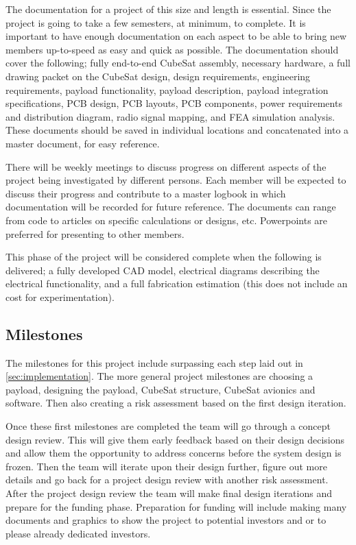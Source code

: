 \documentclass[conference]{IEEEtran} %
\begin{document}
The documentation for a project of this size and length is essential. Since the project is going to take a few semesters, at minimum, to complete. It is important
to have enough documentation on each aspect to be able to bring new members up-to-speed as easy and quick as possible. The documentation should cover the following; fully end-to-end CubeSat assembly,
necessary hardware, a full drawing packet on the CubeSat design, design requirements, engineering requirements, payload functionality, payload description, payload integration specifications, PCB design,
PCB layouts, PCB components, power requirements and distribution diagram, radio signal mapping, and FEA simulation analysis. These documents should be saved in individual locations
and concatenated into a master document, for easy reference.

There will be weekly meetings to discuss progress on different aspects of the project being investigated by different persons. Each member will be expected to discuss
their progress and contribute to a master logbook in which documentation will be recorded for future reference. The documents can range from code to articles on specific calculations
or designs, etc. Powerpoints are preferred for presenting to other members.

This phase of the project will be considered complete when the following is delivered; a fully developed CAD model, electrical diagrams describing the electrical functionality,
and a full fabrication estimation (this does not include an cost for experimentation).

\subsection{Milestones}
\label{subsec:milestones}
The milestones for this project include surpassing each step laid out in \autoref{sec:implementation}. The more general project milestones are choosing a payload,
designing the payload, CubeSat structure, CubeSat avionics and software. Then also creating a risk assessment based on the first design iteration.

Once these first milestones are completed the team will go through a concept design review. This will give them early feedback based on their design decisions and
allow them the opportunity to address concerns before the system design is frozen. Then the team will iterate upon their design further, figure out more details and
go back for a project design review with another risk assessment. After the project design review the team will make final design iterations and prepare for the funding phase.
Preparation for funding will include making many documents and graphics to show the project to potential investors and or to please already dedicated investors.
\end{document}
